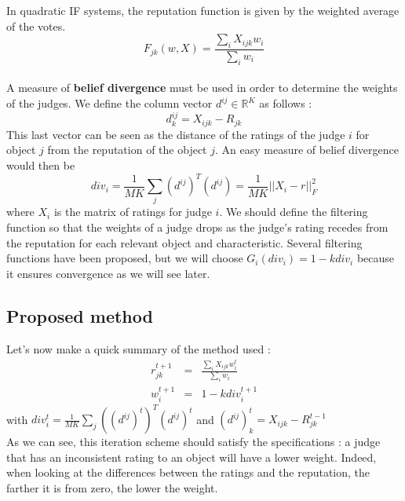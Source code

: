 \documentclass[12pt,a4paper]{article}
\begin{document}
In quadratic IF systems, the reputation function is given by the weighted average of the votes.
$$F_{jk}(w,X) = \frac{\sum_{i}X_{ijk}w_{i}}{\sum_i w_{i}}$$
\\
A measure of \textbf{belief divergence} must be used in order to determine the weights of the judges. 
We define the column vector $d^{ij} \in \mathbb{R}^K$ as follows :
$$ d^{ij}_k = X_{ijk}-R_{jk}$$
This last vector can be seen as the distance of the ratings of the judge $i$ for object $j$ from the reputation of the object $j$. An easy measure of belief divergence would then be 
$$div_i = \frac{1}{MK}\sum_{j} (d^{ij})^T (d^{ij}) = \frac{1}{MK}|| X_i - r ||_F^2$$
where $X_i$ is the matrix of ratings for judge $i$. We should define the filtering function so that the weights of a judge drops as the judge's rating recedes from the reputation for each relevant object and characteristic.
Several filtering functions have been proposed, but we will choose $G_i(div_i) = 1 - k div_i$ because it ensures convergence as we will see later.

\subsection{Proposed method}
\label{section:sub:iteration}

Let's now make a quick summary of the method used :
\begin{eqnarray*}
r^{t+1}_{jk} & = & \frac{\sum_{i}X_{ijk}w^t_{i}}{\sum_i w_{i}} \\
w^{t+1}_i & = & 1 - k div^{t+1}_i
\end{eqnarray*}
with $div^t_i =  \frac{1}{MK}\sum_{j} ((d^{ij})^t)^T (d^{ij})^t$ and $ (d^{ij})^t_k = X_{ijk}-R^{t-1}_{jk}$\\




As we can see, this iteration scheme should satisfy the specifications : a judge that has an inconsistent rating to an object will have a lower weight. Indeed, when looking at the differences between the ratings and the reputation, the farther it is from zero, the lower the weight.
\end{document}
